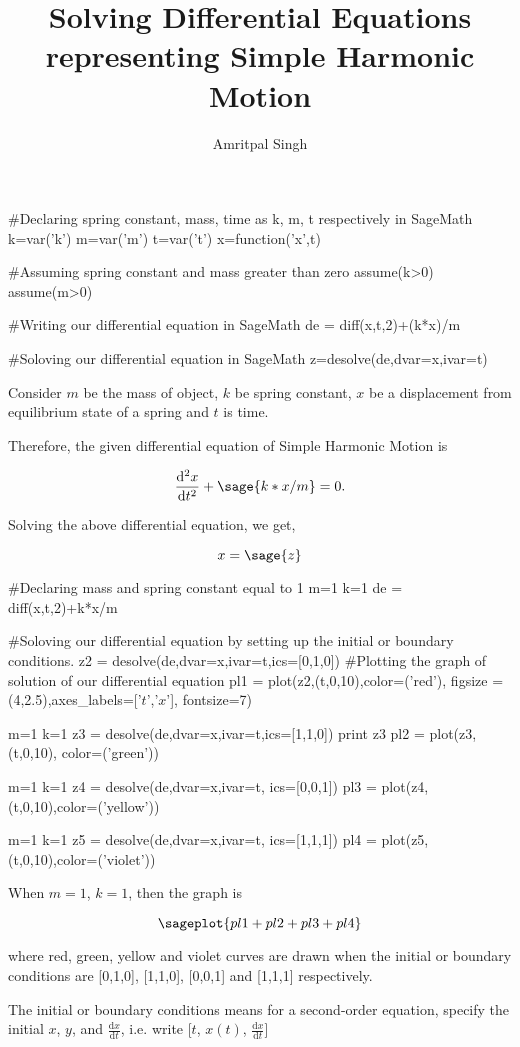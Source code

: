 \documentclass{article}
\title{Solving Differential Equations representing Simple Harmonic Motion}
\author{Amritpal Singh}
\begin{document}
\maketitle

\begin{sagesilent}
#Declaring spring constant, mass, time as k, m, t respectively in SageMath
k=var('k')
m=var('m')
t=var('t')
x=function('x',t)

#Assuming spring constant and mass greater than zero
assume(k>0)
assume(m>0)

#Writing our differential equation in SageMath
de = diff(x,t,2)+(k*x)/m

#Soloving our differential equation in SageMath
z=desolve(de,dvar=x,ivar=t)
\end{sagesilent}

Consider $m$ be the mass of object, $k$ be spring constant, $x$ be a displacement from equilibrium state of a spring and $t$ is time. 

Therefore, the given differential equation of Simple Harmonic Motion is  

\[
  \frac{\mathrm{d}^{2}x}{\mathrm{d}t^{2}} +  \sage{k*x/m} = 0.
\]

Solving the above differential equation, we get,

$$x = \sage{z}$$

\begin{sagesilent}
#Declaring mass and spring constant equal to 1
m=1
k=1
de = diff(x,t,2)+k*x/m

#Soloving our differential equation by setting up the initial or boundary conditions.
z2 = desolve(de,dvar=x,ivar=t,ics=[0,1,0])
#Plotting the graph of solution of our differential equation
pl1 = plot(z2,(t,0,10),color=('red'), figsize = (4,2.5),axes_labels=['$t$','$x$'], fontsize=7)

m=1
k=1
z3 = desolve(de,dvar=x,ivar=t,ics=[1,1,0])
print z3
pl2 = plot(z3,(t,0,10), color=('green'))

m=1
k=1
z4 = desolve(de,dvar=x,ivar=t, ics=[0,0,1])
pl3 = plot(z4,(t,0,10),color=('yellow'))

m=1
k=1
z5 = desolve(de,dvar=x,ivar=t, ics=[1,1,1])
pl4 = plot(z5,(t,0,10),color=('violet'))
\end{sagesilent}

When $m=1$, $k=1$, then the graph is

$$\sageplot{pl1+pl2+pl3+pl4}$$

where red, green, yellow and violet curves are drawn when the initial or boundary conditions are [0,1,0], [1,1,0], [0,0,1] and [1,1,1] respectively.

The initial or boundary conditions means for a second-order equation, specify the initial $x$, $y$, and $\frac{\mathrm{d}x}{\mathrm{d}t}$, i.e. write [$t$, $x(t)$, $\frac{\mathrm{d}x}{\mathrm{d}t}$]
\end{document}
